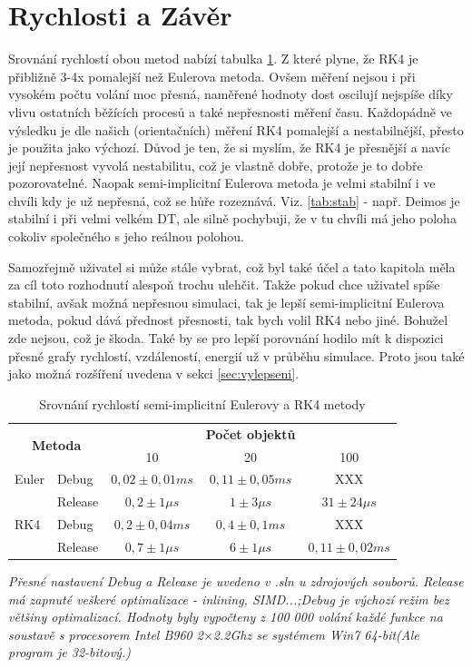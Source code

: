 \section{Rychlosti a Závěr}
Srovnání rychlostí obou metod nabízí tabulka \ref{tab:rychlost}. 
Z které plyne, že RK4 je přibližně 3-4x pomalejší než Eulerova metoda. Ovšem měření nejsou i při vysokém počtu volání moc přesná, naměřené hodnoty dost oscilují nejspíše díky vlivu ostatních běžících procesů a také nepřesnosti měření času. Každopádně ve výsledku je dle našich (orientačních) měření RK4 pomalejší a nestabilnější, přesto je použita jako výchozí. Důvod je ten, že si myslím, že RK4 je přesnější a navíc její nepřesnost vyvolá nestabilitu, což je vlastně dobře, protože je to dobře pozorovatelné. Naopak semi-implicitní Eulerova metoda je velmi stabilní i ve chvíli kdy je už nepřesná, což se hůře rozeznává. Viz. \ref{tab:stab} - např. Deimos je stabilní i při velmi velkém DT, ale silně pochybuji, že v tu chvíli má jeho poloha cokoliv společného s jeho reálnou polohou.

Samozřejmě uživatel si může stále vybrat, což byl také účel a tato kapitola měla za cíl toto rozhodnutí alespoň trochu ulehčit. Takže pokud chce uživatel spíše stabilní, avšak možná nepřesnou simulaci, tak je lepší semi-implicitní Eulerova metoda, pokud dává přednost přesnosti, tak bych volil RK4 nebo jiné. Bohužel  zde nejsou, což je škoda. Také by se pro lepší porovnání hodilo mít k dispozici přesné grafy rychlostí, vzdáleností, energií už v průběhu simulace. Proto jsou také jako možná rozšíření uvedena v sekci \ref{sec:vylepseni}. 
\begin{table}
	\centering
	\caption{Srovnání rychlostí semi-implicitní Eulerovy a RK4 metody}
	\label{tab:rychlost}
	\begin{tabular}{l l c c c}
		\hline\multicolumn{2}{c}{\multirow{2}{*}{\textbf{Metoda}}}& & \textbf{Počet objektů}\\ 
		&& 10 & 20 & 100\\
		\hline
		Euler&Debug&$ 0,02\pm0,01ms $&$ 0,11\pm0,05ms $&XXX\\
			 &Release&$ 0,2\pm 1\mu s $&$ 1\pm 3\mu s $&$ 31\pm 24\mu s $\\\hline
		RK4&Debug&$ 0,2\pm0,04ms $&$ 0,4\pm0,1ms $&XXX\\
		&Release&$ 0,7\pm 1\mu s $&$ 6\pm 1\mu s $&$ 0,11\pm0,02ms $\\\hline
	\end{tabular}
	\newline
	\flushleft
	\textit{Přesné nastavení Debug a Release je uvedeno v .sln u zdrojových souborů. Release má zapnuté veškeré optimalizace - inlining, SIMD...;Debug je výchozí režim bez většiny optimalizací. Hodnoty byly vypočteny z 100 000 volání každé funkce na soustavě s procesorem Intel B960 2$ \times $2.2Ghz se systémem Win7 64-bit(Ale program je 32-bitový.)}
\end{table}
